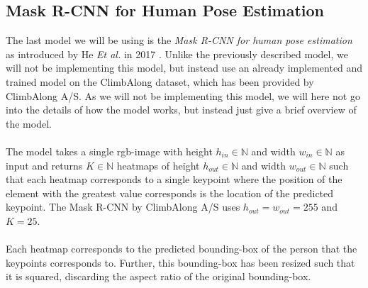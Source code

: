 \documentclass[./main.tex]{subfiles}
\begin{document}
\subsection{Mask R-CNN for Human Pose Estimation}
\label{sec:Mask_RCNN}
The last model we will be using is the \textit{Mask R-CNN for human pose estimation} as introduced by He \textit{Et al.} in 2017 \cite{https://doi.org/10.48550/arxiv.1703.06870}. Unlike the previously described model, we will not be implementing this model, but instead use an already implemented and trained model on the ClimbAlong dataset, which has been provided by ClimbAlong A/S. As we will not be implementing this model, we will here not go into the details of how the model works, but instead just give a brief overview of the model.
\\
\\
The model takes a single rgb-image with height $h_{in} \in \mathbb{N}$ and width $w_{in} \in \mathbb{N}$ as input and returns $K \in \mathbb{N}$ heatmaps of height $h_{out} \in \mathbb{N}$ and width $w_{out} \in \mathbb{N}$ such that each heatmap corresponds to a single keypoint where the position of the element with the greatest value corresponds is the location of the predicted keypoint. The Mask R-CNN by ClimbAlong A/S uses $h_{out} = w_{out} = 255$ and $K = 25$.
\\
\\
Each heatmap corresponds to the predicted bounding-box of the person that the keypoints corresponds to. Further, this bounding-box has been resized such that it is squared, discarding the aspect ratio of the original bounding-box.
\end{document}
